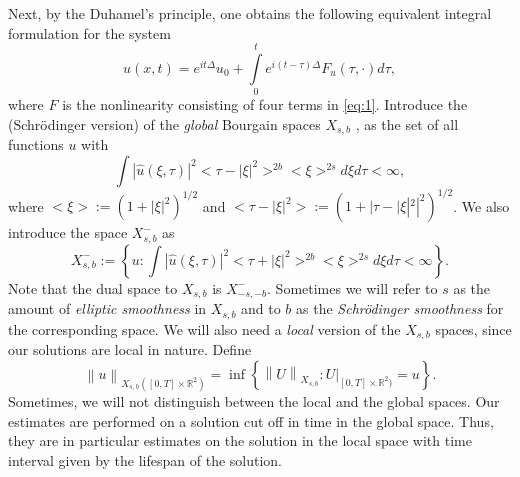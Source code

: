 \documentclass[draft,11pt,leqno]{amsart}
\newcommand{\norm}[2]{{\left\| #1 \right\|}_{#2}}
\newcommand{\De}{\Delta}
\newcommand{\rtwo}{\mathbb R^2}
\newcommand{\intl}{\int\limits}
\begin{document}
Next,  by the Duhamel's principle, one obtains the following equivalent
integral formulation for the system
\begin{equation}
\label{eq:3}
u(x,t)=e^{i t \De}u_0+\intl_0^t e^{i (t-\tau)\De}F_u(\tau, \cdot)d\tau,
\end{equation}
where $F$ is the nonlinearity consisting of four terms  in \eqref{eq:1}.
Introduce the (Schr\"odinger version) of the
{\it global } Bourgain spaces $X_{s,b}$ \cite{Bourgain1}, \cite{Bourgain2} as the set of all functions $u$ with
$$
\int |\hat{u}(\xi,\tau)|^2<\tau-|\xi|^2>^{2b}<\xi>^{2s} d\xi
d\tau<\infty,
$$
where $<\xi>:=(1+|\xi|^2)^{1/2}$ and  $<\tau-|\xi|^2>:=(1+|\tau-|\xi|^2|^2)^{1/2}$. We also introduce the space $X_{s,b}^{-}$ as
$$
X_{s,b}^{-}:=\left\{u:\int |\hat{u}(\xi,\tau)|^2<\tau+|\xi|^2>^{2b}<\xi>^{2s} d\xi
d\tau<\infty\right\}.
$$
Note that the dual space to $X_{s,b}$ is $X_{-s,-b}^{-}$.
Sometimes we will refer to $s$ as the amount of {\it elliptic smoothness} in
$X_{s,b}$ and to
$b$ as the {\it Schr\"odinger smoothness} for the corresponding space.
We will also need a {\it local} version of the $X_{s,b}$ spaces, since
our solutions are local in nature. Define
$$
\norm{u}{X_{s,b}([0,T]\times\rtwo)}=\inf\left\{\norm{U}{X_{s,b}}:
U|_{[0,T]\times\rtwo)}=u\right\}.
$$
Sometimes, we will not distinguish between the local and the global spaces.
Our estimates are performed on a solution cut off in time in the global space.
Thus, they are in particular estimates on the solution in the local
space with time interval given by the lifespan of the solution.
\end{document}
